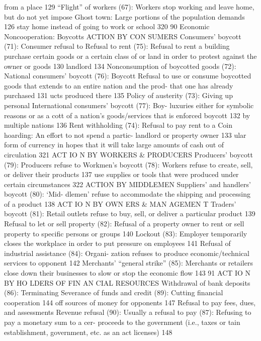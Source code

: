 \documentclass[twoside,a4paper,12pt,fleqn,openany]{extbook}
\begin{document}
from a place
 129
“Flight” of workers (67): Workers stop working
and leave home, but do not yet impose
 Ghost town: Large portions of the population
demands
 126
 stay home instead of going to work or school		
320
90
Economic Noncooperation: Boycotts
ACTION BY CON SUMERS
Consumers’ boycott (71): Consumer refusal to
 Refusal to rent (75): Refusal to rent a building
purchase certain goods or a certain class of
 or land in order to protest against the owner or
goods
 130
 landlord
 134
Nonconsumption of boycotted goods (72):
 National consumers’ boycott (76): Boycott
Refusal to use or consume boycotted goods
 that extends to an entire nation and the prod-
that one has already purchased
 131
 ucts produced there
 135
Policy of austerity (73): Giving up personal
 International consumers’ boycott (77): Boy-
luxuries either for symbolic reasons or as a
 cott of a nation’s goods/services that is enforced
boycott
 132
 by multiple nations
 136
Rent withholding (74): Refusal to pay rent to a
 Coin hoarding: An effort to not spend a partic-
landlord or property owner
 133
 ular form of currency in hopes that it will take
large amounts of cash out of circulation 321
ACT IO N BY WORKERS & PRODUCERS
Producers’ boycott (79): Producers refuse to
 Workmen’s boycott (78): Workers refuse to
create, sell, or deliver their products
 137
 use supplies or tools that were produced under
certain circumstances
 322
ACTION BY MIDDLEMEN
Suppliers’ and handlers’ boycott (80): ‘Mid-
dlemen’ refuse to accommodate the shipping
and processing of a product
 138
ACT IO N BY OWN ERS & MAN AGEMEN T
Traders’ boycott (81): Retail outlets refuse to
buy, sell, or deliver a particular product 139
Refusal to let or sell property (82): Refusal of
a property owner to rent or sell property to
specific persons or groups
 140
Lockout (83): Employer temporarily closes
the workplace in order to put pressure on
employees
 141
Refusal of industrial assistance (84): Organi-
zation refuses to produce economic/technical
services to opponent
 142
Merchants’ “general strike” (85): Merchants
or retailers close down their businesses to slow
or stop the economic flow
 143
91
ACT IO N BY HO LDERS OF FIN AN CIAL RESOURCES
Withdrawal of bank deposits (86): Terminating
 Severance of funds and credit (89): Cutting
financial cooperation
 144
 off sources of money for opponents
 147
Refusal to pay fees, dues, and assessments
 Revenue refusal (90): Usually a refusal to pay
(87): Refusing to pay a monetary sum to a cer-
 proceeds to the government (i.e., taxes or
tain establishment, government, etc. as an act
 licenses)
 148
\end{document}
